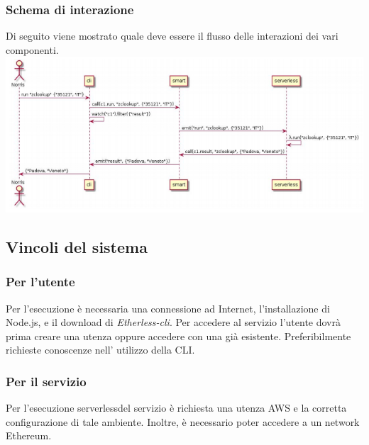 \subsubsection{Schema di interazione}
Di seguito viene mostrato quale deve essere il flusso delle interazioni dei vari componenti.\\
	\includegraphics[width=\textwidth]{res/img/calls-flow}
\subsection{Vincoli del sistema}
\subsubsection{Per l'utente}
Per l'esecuzione è necessaria una connessione ad Internet, l'installazione di Node.js, e il download di \textit{Etherless-cli}. Per accedere al servizio l'utente dovrà prima creare una utenza oppure accedere con una già esistente. Preferibilmente richieste conoscenze nell' utilizzo della CLI\glo.
\subsubsection{Per il servizio}
Per l'esecuzione serverless\glo del servizio è richiesta una utenza AWS e la corretta configurazione di tale ambiente. Inoltre, è necessario poter accedere a un network Ethereum\glo.
	
	
